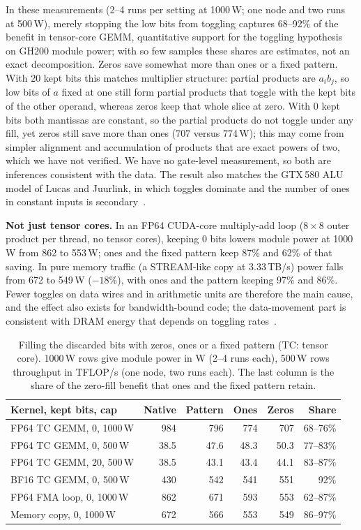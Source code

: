 \documentclass[conference]{IEEEtran}
\newcommand{\W}{\,W}
\newcommand{\pct}{\%}
\begin{document}
In these measurements (2--4 runs per setting at 1000\W; one node and two runs at 500\W), merely stopping the low bits
from toggling captures 68--92\pct{} of the benefit in tensor-core GEMM, quantitative support for the toggling
hypothesis~\cite{Gregersen2024} on GH200 module power; with so few samples these shares are estimates, not an exact
decomposition. Zeros save somewhat more than ones or a fixed
pattern. With 20 kept bits this matches multiplier structure: partial products are $a_i b_j$, so low bits of $a$
fixed at one still form partial products that toggle with the kept bits of the other operand, whereas zeros keep
that whole slice at zero. With 0 kept bits both mantissas are constant, so the partial products do not toggle under
any fill, yet zeros still save more than ones (707 versus 774\W); this may come from simpler alignment and
accumulation of products that are exact powers of two, which we have not verified. We have no gate-level
measurement, so both are inferences consistent with the data. The result also matches the GTX\,580 ALU model of
Lucas and Juurlink, in which toggles dominate and the number of ones in constant inputs is
secondary~\cite{Lucas2016}.

\textbf{Not just tensor cores.} In an FP64 CUDA-core multiply-add loop ($8{\times}8$ outer product per thread, no
tensor cores), keeping 0 bits lowers module power at 1000\W{} from 862 to 553\W; ones and the fixed pattern keep
87\pct{} and 62\pct{} of that saving. In pure memory traffic (a STREAM-like copy at 3.33\,TB/s) power falls from 672
to 549\W{} ($-18\pct$), with ones and the pattern keeping 97\pct{} and 86\pct. Fewer toggles on data wires and in
arithmetic units are therefore the main cause, and the effect also exists for bandwidth-bound code; the
data-movement part is consistent with DRAM energy that depends on toggling rates~\cite{Chatterjee2017,Ghose2018}.

\begin{table}[t]
\caption{Filling the discarded bits with zeros, ones or a fixed pattern (TC: tensor core). 1000\W{} rows give module
power in W (2--4 runs each), 500\W{} rows throughput in TFLOP/s (one node, two runs each). The last column is the share of the
zero-fill benefit that ones and the fixed pattern retain.}\label{tab:fill}
\centering\footnotesize\setlength{\tabcolsep}{2.4pt}
\begin{tabular}{@{}lrrrrr@{}}
\toprule
Kernel, kept bits, cap & Native & Pattern & Ones & Zeros & Share \\
\midrule
FP64 TC GEMM, 0, 1000\W & 984 & 796 & 774 & 707 & 68--76\pct \\
FP64 TC GEMM, 0, 500\W & 38.5 & 47.6 & 48.3 & 50.3 & 77--83\pct \\
FP64 TC GEMM, 20, 500\W & 38.5 & 43.1 & 43.4 & 44.1 & 83--87\pct \\
BF16 TC GEMM, 0, 500\W & 430 & 542 & 541 & 551 & 92\pct \\
FP64 FMA loop, 0, 1000\W & 862 & 671 & 593 & 553 & 62--87\pct \\
Memory copy, 0, 1000\W & 672 & 566 & 553 & 549 & 86--97\pct \\
\bottomrule
\end{tabular}
\end{table}
\end{document}
